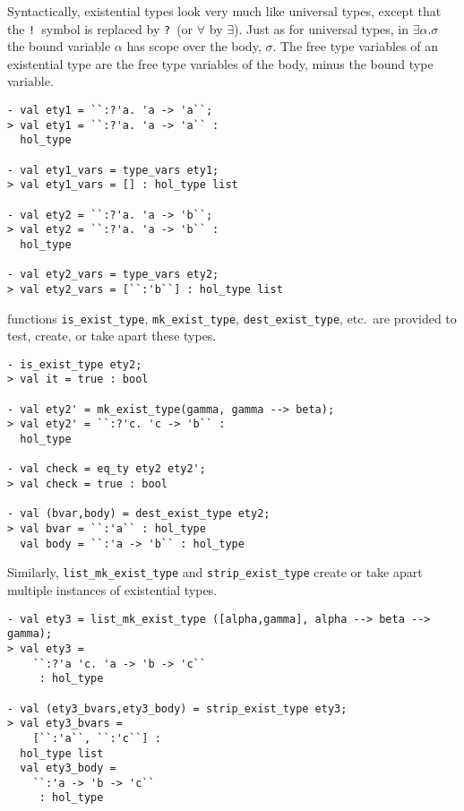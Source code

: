 Syntactically, existential types look very much like universal types, 
except that the {\tt !}~symbol is replaced by 
{\tt ?}~(or $\forall$ by $\exists$).
Just as for universal types, in $\exists\alpha.\sigma$ the
bound variable $\alpha$ has scope over the body, $\sigma$.
The free type variables of an existential type are the free type
variables of the body, minus the bound type variable.
\begin{session}
\begin{verbatim}
- val ety1 = ``:?'a. 'a -> 'a``;
> val ety1 = ``:?'a. 'a -> 'a`` :
  hol_type
  
- val ety1_vars = type_vars ety1;
> val ety1_vars = [] : hol_type list

- val ety2 = ``:?'a. 'a -> 'b``;
> val ety2 = ``:?'a. 'a -> 'b`` :
  hol_type
  
- val ety2_vars = type_vars ety2;
> val ety2_vars = [``:'b``] : hol_type list
\end{verbatim}
\end{session}

\ML{} functions {\tt is\_exist\_type}, {\tt mk\_exist\_type}, {\tt dest\_exist\_type},
etc.~are provided to test, create, or take apart 
these types.
\begin{session}
\begin{verbatim}
- is_exist_type ety2;
> val it = true : bool

- val ety2' = mk_exist_type(gamma, gamma --> beta);
> val ety2' = ``:?'c. 'c -> 'b`` :
  hol_type
  
- val check = eq_ty ety2 ety2';
> val check = true : bool

- val (bvar,body) = dest_exist_type ety2;
> val bvar = ``:'a`` : hol_type
  val body = ``:'a -> 'b`` : hol_type
\end{verbatim}
\end{session}

Similarly, {\tt list\_mk\_exist\_type} and {\tt strip\_exist\_type} create or take
apart multiple instances of existential types.
\begin{session}
\begin{verbatim}
- val ety3 = list_mk_exist_type ([alpha,gamma], alpha --> beta --> gamma);
> val ety3 =
    ``:?'a 'c. 'a -> 'b -> 'c``
     : hol_type
     
- val (ety3_bvars,ety3_body) = strip_exist_type ety3;
> val ety3_bvars =
    [``:'a``, ``:'c``] :
  hol_type list
  val ety3_body =
    ``:'a -> 'b -> 'c``
     : hol_type
\end{verbatim}
\end{session}


